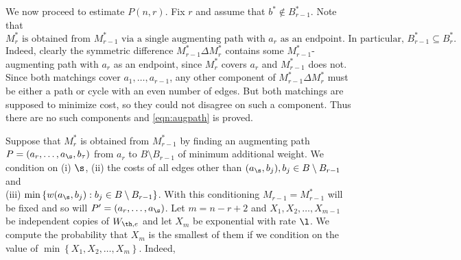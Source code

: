 \documentclass[12pt]{article}
\newcommand{\1}{\textbf{1}}
\def\t{\tau} \def\om{\omega} \def\OM{\Omega} \def\Om{\Omega}\def\up{\upsilon}\def\U{\Upsilon}
\newcommand{\set}[1]{\left\{#1\right\}}
\begin{document}
We now proceed to estimate $P(n,r)$. Fix $r$ and assume that $b^*\notin B_{r-1}^*$. Note that 
\begin{equation}\label{eqn:augpath}
    \text{$M_r^*$ is obtained from $M_{r-1}^*$ via a single augmenting path with $a_r$ as an endpoint. In particular, $B_{r-1}^* \subseteq B_r^*.$}
\end{equation}
Indeed, clearly the symmetric difference $M_{r-1}^* \Delta M_r^*$ contains some $M_{r-1}^*$-augmenting path with $a_r$ as an endpoint, since $M_r^*$ covers $a_r$ and $M_{r-1}^*$ does not. Since both matchings cover $a_1, \ldots, a_{r-1}$, any other component of $M_{r-1}^* \Delta M_r^*$ must be either a path or cycle with an even number of edges. But both matchings are supposed to minimize cost, so they could not disagree on such a component. Thus there are no such components and \eqref{eqn:augpath} is proved.

Suppose that $M_{r}^*$ is obtained from $M_{r-1}^*$ by finding an augmenting path $P=(a_{r},\ldots,a_{\s},b_\t)$ from $a_{r}$ to $B\setminus B_{r-1}$ of minimum additional weight. We condition on (i) $\s$, (ii) the costs of all edges other than $(a_\s,b_j),b_j\in B\setminus B_{r-1}$ and \\
(iii) $\min\set{w(a_\s,b_j):b_j\in B\setminus B_{r-1}}$. With this conditioning $M_{r-1}=M_{r-1}^*$ will be fixed and so will $P'=(a_{r},\ldots,a_\s)$. Let $m=n-r+2$ and $X_1,X_2,\ldots,X_{m-1}$ be independent copies of $W_{\th,e}$  and let $X_m$ be exponential with rate $\l$. We compute the probability that $X_m$ is the smallest of them if we condition on the value of $\min\set{X_1,X_2,\ldots,X_m}$. Indeed, 
\end{document}
